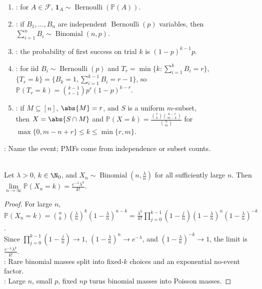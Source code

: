 \begin{method} \label{meth:discrete-distribution-model-recipes} 
\begin{enumerate}[label=(\roman*)]
\setlength{\itemsep}{0pt}
\item {}: for $A\in\mathcal{F}$, $\mathbf{1}_A\sim\operatorname{Bernoulli}(\mathbb{P}(A))$.
\item {}: if $B_1,\ldots,B_n$ are independent $\operatorname{Bernoulli}(p)$ variables, then $\sum\limits_{i=1}^{n}B_i\sim\operatorname{Binomial}(n,p)$.
\item {}: the probability of first success on trial $k$ is $(1-p)^{k-1}p$.
\item {}: for iid $B_i\sim\operatorname{Bernoulli}(p)$ and $T_r=\min\{k:\sum\limits_{i=1}^{k}B_i=r\}$,\\
$\{T_r=k\}=\{B_k=1,\sum\limits_{i=1}^{k-1}B_i=r-1\}$, so $\mathbb{P}(T_r=k)=\binom{k-1}{r-1}p^r(1-p)^{k-r}$.
\item {}: if $M\subseteq[n]$, $\abs{M}=r$, and $S$ is a uniform $m$-subset,\\
then $X=\abs{S\cap M}$ and $\mathbb{P}(X=k)=\frac{\binom{r}{k}\binom{n-r}{m-k}}{\binom{n}{m}}$ for $\max\{0,m-n+r\}\leq k\leq\min\{r,m\}$.
\end{enumerate}
: Name the event; PMFs come from independence or subset counts.
\end{method}

\begin{proposition} \label{prop:poisson-limit-of-binomial} \\
Let $\lambda>0$, $k\in\N_0$, and $X_n\sim\operatorname{Binomial}(n,\frac{\lambda}{n})$ for all sufficiently large $n$. Then $\lim\limits_{n\to\infty}\mathbb{P}(X_n=k)=\frac{e^{-\lambda}\lambda^k}{k!}$.
\begin{proof}
For large $n$, $\mathbb{P}(X_n=k)=\binom{n}{k}(\frac{\lambda}{n})^k(1-\frac{\lambda}{n})^{n-k}=\frac{\lambda^k}{k!}\prod\limits_{j=0}^{k-1}(1-\frac{j}{n})(1-\frac{\lambda}{n})^n(1-\frac{\lambda}{n})^{-k}$.\\
Since $\prod\limits_{j=0}^{k-1}(1-\frac{j}{n})\to1$, $(1-\frac{\lambda}{n})^n\to e^{-\lambda}$, and $(1-\frac{\lambda}{n})^{-k}\to1$, the limit is $\frac{e^{-\lambda}\lambda^k}{k!}$.\\
: Rare binomial masses split into fixed-$k$ choices and an exponential no-event factor.\\
: Large $n$, small $p$, fixed $np$ turns binomial masses into Poisson masses.
\end{proof}
\end{proposition}

